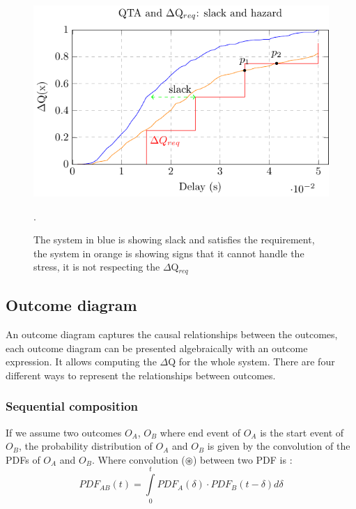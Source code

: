         \begin{figure}[H]
            \begin{center}
                \includegraphics[scale=1.2]{tikz/cdf_qta_slack.pdf}
            \end{center}
            \caption{The system in blue is showing slack and satisfies the requirement, the system in orange is showing signs that it cannot handle the stress, it is not respecting the $\Delta$Q$_{req}$}.
        \end{figure}


    \subsection{Outcome diagram}
        An outcome diagram captures the causal relationships between the outcomes, each outcome diagram can be presented algebraically with an outcome expression. It allows computing the $\Delta$Q for the whole system.
        There are four different ways to represent the relationships between outcomes.

    \subsubsection{Sequential composition}
        If we assume two outcomes $O_A$, $O_B$ where end event of $O_A$ is the start event of $O_B$, the probability distribution of $O_A$ and $O_B$ is given by the convolution of the PDFs of $O_A$ and $O_B$.
        Where convolution ($\circledast$) between two PDF is :
        \begin{equation}
            PDF_{AB}(t) =\int\limits_0^t PDF_A(\delta) \cdot PDF_B(t-\delta)d\delta 
            \label{eq:}
        \end{equation}

